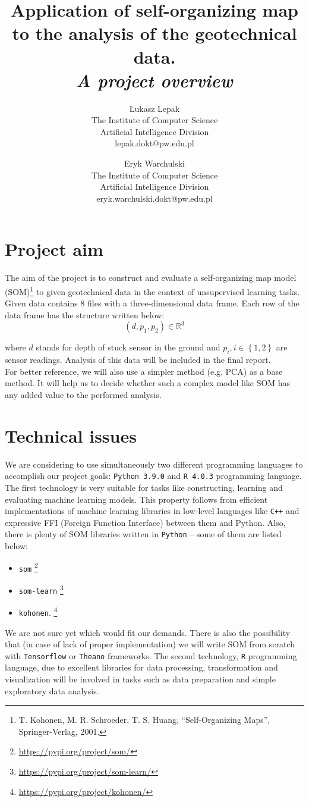 \documentclass{article}
\title{\textbf{Application of self-organizing map to the analysis of the geotechnical data}.\\ \textit{A project overview}}
\author{%
\begin{tabular}{c} Łukasz Lepak \\ The Institute of Computer Science \\ Artificial Intelligence Division \\ lepak.dokt@pw.edu.pl \end{tabular} \and
\begin{tabular}{c} Eryk Warchulski \\  The Institute of Computer Science \\ Artificial Intelligence Division \\ eryk.warchulski.dokt@pw.edu.pl \end{tabular} 
}
\date{}
\begin{document}
\maketitle

\section{Project aim}
The aim of the project is to construct and evaluate a self-organizing map model (SOM)\footnote{T. Kohonen, M. R. Schroeder, T. S. Huang, “Self-Organizing Maps”, Springer-Verlag, 2001.} to given geotechnical data in the context of unsupervised learning tasks.
Given data contains 8 files with a three-dimensional data frame. Each row of the data frame has the structure written below:
\begin{equation}
  \left(d, p_1, p_2 \right) \in \mathbb{R}^{3}
\end{equation}

\noindent where $d$ stands for depth of stuck sensor in the ground and $p_i, i\in\left\{1, 2\right\}$ are sensor readings. Analysis of this data will be included in the final report.\\
For better reference, we will also use a simpler method (e.g. PCA) as a base method. It will help us to decide whether such a complex model like SOM has any added value to the performed analysis. 

\section{Technical issues}

We are considering to use simultaneously two different programming languages to accomplish our project goals: \texttt{Python 3.9.0} and \texttt{R 4.0.3} programming language.
The first technology is very suitable for tasks like constructing, learning and evaluating machine learning models. This property follows from efficient implementations of machine learning libraries in low-level languages like \texttt{C++} and expressive FFI (Foreign Function Interface) between them and Python. Also, there is plenty of SOM libraries written in \texttt{Python} -- some of them are listed below:

\begin{itemize}
  \item \texttt{som} \footnote{\url{https://pypi.org/project/som/}}
  \item \texttt{som-learn} \footnote{\url{https://pypi.org/project/som-learn/}}
  \item \texttt{kohonen}. \footnote{\url{https://pypi.org/project/kohonen/}}
\end{itemize}

We are not sure yet which would fit our demands. There is also the possibility that (in case of lack of proper implementation) we will write SOM from scratch with \texttt{Tensorflow} or \texttt{Theano} frameworks.
The second technology, \texttt{R} programming language, due to excellent libraries for data processing, transformation and visualization will be involved in tasks such as data preparation and simple exploratory data analysis.
\end{document}
